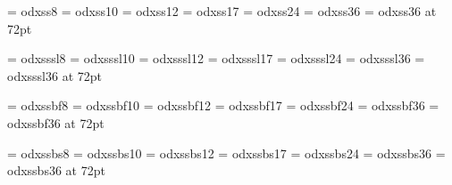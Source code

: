 \def\odxbsVIII{\odxbs@VIII\baselineskip=9pt}
\def\odxbs{\odxbs@X\baselineskip=12pt}
\def\odxbsXII{\odxbs@XII\baselineskip=15pt}
\def\odxbsXVII{\odxbs@XVII\baselineskip=20pt}
\def\odxbsXXIV{\odxbs@XXIV\baselineskip=26pt}
\def\odxbsXXXVI{\odxbs@XXXVI\baselineskip=36pt}
\def\odxbsLXXII{\odxbs@LXXII\baselineskip=72pt}




\font\odxss@VIII     = odxss8
\font\odxss@X	     = odxss10
\font\odxss@XII      = odxss12
\font\odxss@XVII     = odxss17
\font\odxss@XXIV     = odxss24
\font\odxss@XXXVI    = odxss36
\font\odxss@LXXII    = odxss36 at 72pt

\font\odxsssl@VIII   = odxsssl8
\font\odxsssl@X      = odxsssl10
\font\odxsssl@XII    = odxsssl12
\font\odxsssl@XVII   = odxsssl17
\font\odxsssl@XXIV   = odxsssl24
\font\odxsssl@XXXVI  = odxsssl36
\font\odxsssl@LXXII  = odxsssl36 at 72pt

\font\odxssbf@VIII   = odxssbf8
\font\odxssbf@X      = odxssbf10
\font\odxssbf@XII    = odxssbf12
\font\odxssbf@XVII   = odxssbf17
\font\odxssbf@XXIV   = odxssbf24
\font\odxssbf@XXXVI  = odxssbf36
\font\odxssbf@LXXII  = odxssbf36 at 72pt

\font\odxssbs@VIII   = odxssbs8
\font\odxssbs@X      = odxssbs10
\font\odxssbs@XII    = odxssbs12
\font\odxssbs@XVII   = odxssbs17
\font\odxssbs@XXIV   = odxssbs24
\font\odxssbs@XXXVI  = odxssbs36
\font\odxssbs@LXXII  = odxssbs36 at 72pt

\def\odxssVIII{\odxss@VIII\baselineskip=9pt}
\def\odxss{\odxss@X\baselineskip=12pt}
\def\odxssXII{\odxss@XII\baselineskip=15pt}
\def\odxssXVII{\odxss@XVII\baselineskip=20pt}
\def\odxssXXIV{\odxss@XXIV\baselineskip=26pt}
\def\odxssXXXVI{\odxss@XXXVI\baselineskip=36pt}
\def\odxssLXXII{\odxss@LXXII\baselineskip=72pt}

\def\odxssslVIII{\odxsssl@VIII\baselineskip=9pt}
\def\odxsssl{\odxsssl@X\baselineskip=12pt}
\def\odxssslXII{\odxsssl@XII\baselineskip=15pt}
\def\odxssslXVII{\odxsssl@XVII\baselineskip=20pt}
\def\odxssslXXIV{\odxsssl@XXIV\baselineskip=26pt}
\def\odxssslXXXVI{\odxsssl@XXXVI\baselineskip=36pt}
\def\odxssslLXXII{\odxsssl@LXXII\baselineskip=72pt}

\def\odxssbfVIII{\odxssbf@VIII\baselineskip=9pt}
\def\odxssbf{\odxssbf@X\baselineskip=12pt}
\def\odxssbfXII{\odxssbf@XII\baselineskip=15pt}
\def\odxssbfXVII{\odxssbf@XVII\baselineskip=20pt}
\def\odxssbfXXIV{\odxssbf@XXIV\baselineskip=26pt}
\def\odxssbfXXXVI{\odxssbf@XXXVI\baselineskip=36pt}
\def\odxssbfLXXII{\odxssbf@LXXII\baselineskip=72pt}

